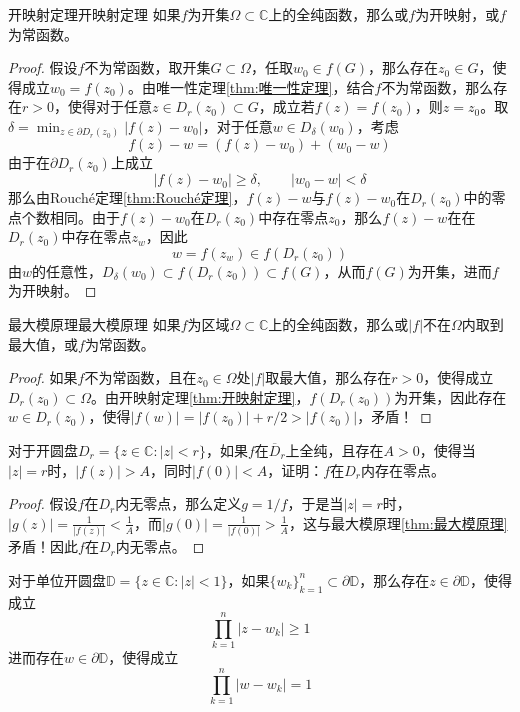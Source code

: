 \documentclass[lang = cn, scheme = chinese, thmcnt = section]{elegantbook}
\newcommand{\C}{\mathbb{C}}  		   %
\newcommand{\sub}{\subset}             %
\newcommand{\dis}{\displaystyle}
\begin{document}
\begin{theorem}{开映射定理}{开映射定理}
	如果$f$为开集$\Omega\sub\C$上的全纯函数，那么或$f$为开映射，或$f$为常函数。
\end{theorem}

\begin{proof}
	假设$f$不为常函数，取开集$G\sub \Omega$，任取$w_0\in f(G)$，那么存在$z_0\in G$，使得成立$w_0=f(z_0)$。由唯一性定理\ref{thm:唯一性定理}，结合$f$不为常函数，那么存在$r>0$，使得对于任意$z\in D_r(z_0)\sub G$，成立若$f(z)= f(z_0)$，则$z=z_0$。取$\dis\delta=\min_{z\in\partial D_r(z_0)}|f(z)-w_0|$，对于任意$w\in D_\delta(w_0)$，考虑%
	$$
	f(z)-w=(f(z)-w_0)+(w_0-w)
	$$
	由于在$\partial D_r(z_0)$上成立%
	$$
	|f(z)-w_0|\ge\delta,\qquad 
	|w_0-w|<\delta
	$$
	那么由Rouché定理\ref{thm:Rouché定理}，$f(z)-w$与$f(z)-w_0$在$D_r(z_0)$中的零点个数相同。由于$f(z)-w_0$在$D_r(z_0)$中存在零点$z_0$，那么$f(z)-w$在在$D_r(z_0)$中存在零点$z_w$，因此%
	$$
	w=f(z_w)\in f(D_r(z_0))
	$$
	由$w$的任意性，$D_\delta(w_0)\sub f(D_r(z_0))\sub f(G)$，从而$f(G)$为开集，进而$f$为开映射。
\end{proof}

\begin{theorem}{最大模原理}{最大模原理}
	如果$f$为区域$\Omega\sub\C$上的全纯函数，那么或$|f|$不在$\Omega$内取到最大值，或$f$为常函数。
\end{theorem}

\begin{proof}
	如果$f$不为常函数，且在$z_0\in\Omega$处$|f|$取最大值，那么存在$r>0$，使得成立$D_r(z_0)\sub\Omega$。由开映射定理\ref{thm:开映射定理}，$f(D_r(z_0))$为开集，因此存在$w\in D_r(z_0)$，使得$|f(w)|=|f(z_0)|+r/2>|f(z_0)|$，矛盾！
\end{proof}

\begin{proposition}
	对于开圆盘$D_r=\{ z\in\C:|z|< r \}$，如果$f$在$\overline{D}_r$上全纯，且存在$A>0$，使得当$|z|=r$时，$|f(z)|>A$，同时$|f(0)|<A$，证明：$f$在$D_r$内存在零点。
\end{proposition}

\begin{proof}
	假设$f$在$D_r$内无零点，那么定义$g=1/f$，于是当$|z|=r$时，$|g(z)|=\frac{1}{|f(z)|}<\frac{1}{A}$，而$|g(0)|=\frac{1}{|f(0)|}>\frac{1}{A}$，这与最大模原理\ref{thm:最大模原理}矛盾！因此$f$在$D_r$内无零点。
\end{proof}

\begin{proposition}
	对于单位开圆盘$\mathbb{D}=\{ z\in\C:|z|<1 \}$，如果$\{ w_k \}_{k=1}^{n}\sub\partial\mathbb{D}$，那么存在$z\in\partial\mathbb{D}$，使得成立
	$$
	\prod_{k=1}^{n}|z-w_k|\ge 1
	$$
	进而存在$w\in\partial\mathbb{D}$，使得成立
	$$
	\prod_{k=1}^{n}|w-w_k|=1
	$$
\end{proposition}
\end{document}
